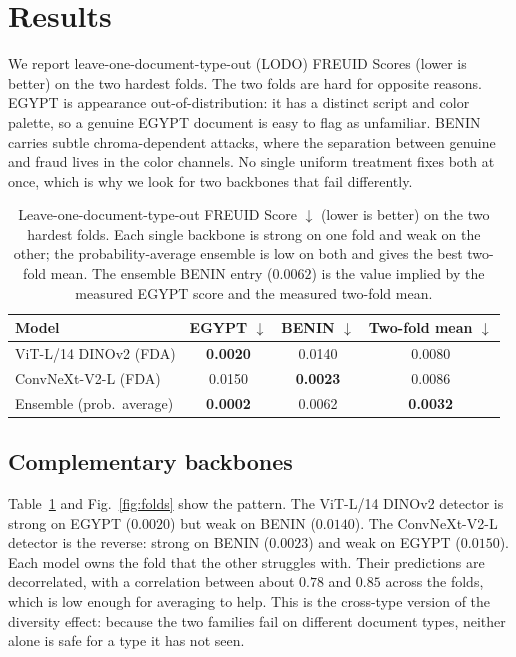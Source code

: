 \documentclass[11pt,a4paper]{article}
\begin{document}
\section{Results}
\label{sec:results}
We report leave-one-document-type-out (LODO) FREUID Scores (lower is better) on the two hardest folds. The
two folds are hard for opposite reasons. EGYPT is appearance out-of-distribution: it has a distinct script
and color palette, so a genuine EGYPT document is easy to flag as unfamiliar. BENIN carries subtle
chroma-dependent attacks, where the separation between genuine and fraud lives in the color channels. No
single uniform treatment fixes both at once, which is why we look for two backbones that fail differently.

\begin{table}[t]
\centering
\small
\setlength{\tabcolsep}{7pt}
\caption{Leave-one-document-type-out FREUID Score $\downarrow$ (lower is better) on the two hardest folds.
Each single backbone is strong on one fold and weak on the other; the probability-average ensemble is low on
both and gives the best two-fold mean. The ensemble BENIN entry ($0.0062$) is the value implied by the
measured EGYPT score and the measured two-fold mean.}
\label{tab:folds}
\begin{tabular}{lccc}
\toprule
Model & EGYPT $\downarrow$ & BENIN $\downarrow$ & Two-fold mean $\downarrow$ \\
\midrule
ViT-L/14 DINOv2 (FDA)     & \textbf{0.0020} & 0.0140          & 0.0080 \\
ConvNeXt-V2-L (FDA)       & 0.0150          & \textbf{0.0023} & 0.0086 \\
Ensemble (prob.\ average) & \textbf{0.0002} & 0.0062          & \textbf{0.0032} \\
\bottomrule
\end{tabular}
\end{table}

\subsection{Complementary backbones}
Table~\ref{tab:folds} and Fig.~\ref{fig:folds} show the pattern. The ViT-L/14 DINOv2 detector is strong on
EGYPT ($0.0020$) but weak on BENIN ($0.0140$). The ConvNeXt-V2-L detector is the reverse: strong on BENIN
($0.0023$) and weak on EGYPT ($0.0150$). Each model owns the fold that the other struggles with. Their
predictions are decorrelated, with a correlation between about $0.78$ and $0.85$ across the folds, which is
low enough for averaging to help. This is the cross-type version of the diversity effect: because the two
families fail on different document types, neither alone is safe for a type it has not seen.
\end{document}
